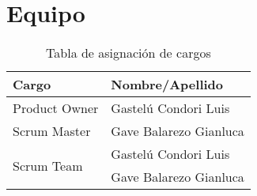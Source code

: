 \chapter{Equipo}
\begin{table}[htbp]
	\begin{center}
		\begin{tabular}{|l|l|}
			\hline
			Cargo & Nombre/Apellido \\
			\hline \hline
			Product Owner &  Gastelú Condori Luis\\ \hline
			Scrum Master & Gave Balarezo Gianluca \\ \hline \multirow{2}{1cm}{Scrum Team} & Gastelú Condori Luis \\ \cline{2-2}
			& Gave Balarezo Gianluca \\ \hline
		\end{tabular}
	\caption{Tabla de asignación de cargos}
	\end{center}
\end{table}